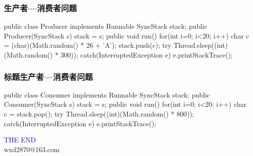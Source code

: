 \begin{frame}[fragile]
  \frametitle{生产者—消费者问题}

  
  \begin{javaCode}
    public class Producer implements Runnable {
      SyncStack stack;
      public Producer(SyncStack s) {
        stack = s;
      }
      public void run() {
        for(int i=0; i<20; i++) {
          char c = (char)(Math.random() * 26 + 'A');
          stack.push(c);
          try {
            Thread.sleep((int)(Math.random() * 300));
          } catch(InterruptedException e) {
            e.printStackTrace();
          }
        }
      }
    }    
  \end{javaCode}
\end{frame}

\begin{frame}[fragile]
  \frametitle{标题生产者—消费者问题}

  
  \begin{javaCode}
    public class Consumer implements Runnable {
      SyncStack stack;
      public Consumer(SyncStack s) {
        stack = s;
      }
      public void run() {
        for(int i=0; i<20; i++) {
          char c = stack.pop();
          try {
            Thread.sleep((int)(Math.random() * 800));
          } catch(InterruptedException e) {
            e.printStackTrace();
          }
        }
      }
    }
  \end{javaCode}
\end{frame}


\begin{frame}
\centering
{\Huge \textcolor{blue}{THE END}} \\
\vspace{5mm}
{\Large wxd2870@163.com} \\
\end{frame}

